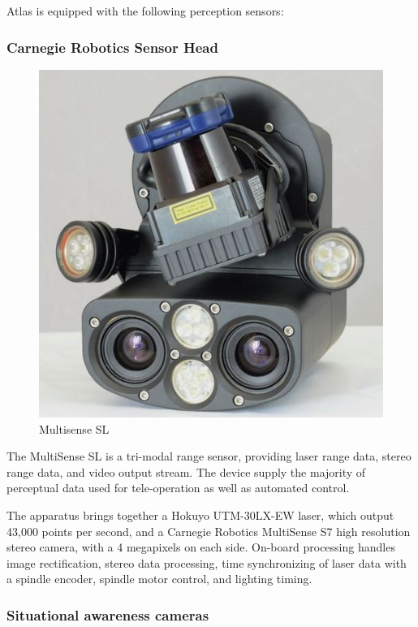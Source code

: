 \documentclass[12pt]{report}
\begin{document}
Atlas is equipped with the following perception sensors:

\subsubsection{Carnegie Robotics Sensor Head}
\begin{figure}
  \begin{center}
    \includegraphics[scale=0.25]{images/sensorhead.jpg}
  \end{center}
  \caption{Multisense SL}
\end{figure}


The MultiSense SL is a tri-modal range sensor, providing laser range data, stereo range data, and video output stream. The device supply the majority of perceptual data used for tele-operation as well as automated control. 

The apparatus brings together a Hokuyo UTM-30LX-EW laser, which output 43,000 points per second, and a Carnegie Robotics MultiSense S7 high resolution stereo camera, with a 4 megapixels on each side.  On-board processing handles image rectification, stereo data processing, time synchronizing of laser data with a spindle encoder, spindle motor control, and lighting timing. \cite{multisense-sl}

\subsubsection{Situational awareness cameras}
\end{document}

